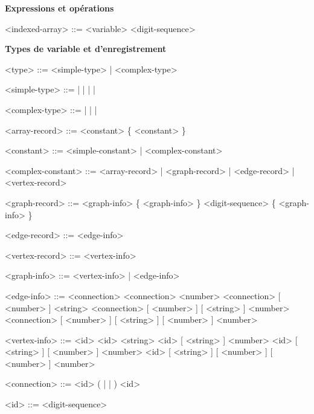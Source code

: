 \documentclass[french]{article}
\begin{document}
		\textbf{Expressions et opérations}
		\begin{grammar}
			<indexed-array> ::= <variable> \lit{[} <digit-sequence> \lit{]}
		\end{grammar}
		
		\textbf{Types de variable et d'enregistrement}
		\begin{grammar}
			<type> ::= <simple-type> | <complex-type>
			
			<simple-type> ::=  |  |  |  | \lit{String}
			
			<complex-type> ::=  |  |  | \lit{Edge}
			
			<array-record> ::= \lit{[} <constant> \{ \lit{,} <constant> \} \lit{]}
			
			<constant> ::= <simple-constant> | <complex-constant>
			
			<complex-constant> ::= <array-record> | <graph-record> | <edge-record> | <vertex-record>
			
			<graph-record> ::= \lit{\{} <graph-info> \{ \lit{,} <graph-info> \} \lit{\}}
			\alt \lit{\{} \lit{\#} <digit-sequence> \{ \lit{,} <graph-info> \} \lit{\}}
			
			<edge-record> ::= \lit{(} <edge-info> \lit{)}
			
			<vertex-record> ::= \lit{(} <vertex-info> \lit{)}
			
			<graph-info> ::= <vertex-info> | <edge-info>
			
			<edge-info> ::= <connection> 
			\alt <connection> 
			\alt <connection> \lit{:} [ <number> ] 
			\alt <connection> \lit{:} [ <number> ] \lit{:} [ <string> ] 
			\alt <connection> \lit{:} [ <number> ] \lit{:} [ <string> ] \lit{:} [ <number> ] 
			
			<vertex-info> ::= <id> 
			\alt <id> 
			\alt <id> \lit{:} [ <string> ] 
			\alt <id> \lit{:} [ <string> ] \lit{:} [ <number> ] 
			\alt <id> \lit{:} [ <string> ] \lit{:} [ <number> ] \lit{:} [ <number> ] 
			
			<connection> ::= <id> ( \lit{\textendash\textemdash} | \lit{\textemdash\textgreater} | \lit{\textless\textemdash} ) <id>
			
			<id> ::= <digit-sequence>
		\end{grammar}
		
\end{document}
